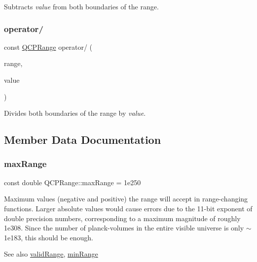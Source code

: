 Subtracts {\itshape value} from both boundaries of the range. \hypertarget{class_q_c_p_range_a4b366a3a21974c88e09b0d39d4a24a4b}{}\label{class_q_c_p_range_a4b366a3a21974c88e09b0d39d4a24a4b} 
\subsubsection{\texorpdfstring{operator/}{operator/}}
{\footnotesize\ttfamily const \hyperlink{class_q_c_p_range}{Q\+C\+P\+Range} operator/ (\begin{DoxyParamCaption}\item[{const \hyperlink{class_q_c_p_range}{Q\+C\+P\+Range} \&}]{range,  }\item[{double}]{value }\end{DoxyParamCaption})\hspace{0.3cm}{\ttfamily [friend]}}

Divides both boundaries of the range by {\itshape value}. 

\subsection{Member Data Documentation}
\hypertarget{class_q_c_p_range_a5ca51e7a2dc5dc0d49527ab171fe1f4f}{}\label{class_q_c_p_range_a5ca51e7a2dc5dc0d49527ab171fe1f4f} 
\subsubsection{\texorpdfstring{max\+Range}{maxRange}}
{\footnotesize\ttfamily const double Q\+C\+P\+Range\+::max\+Range = 1e250\hspace{0.3cm}{\ttfamily [static]}}

Maximum values (negative and positive) the range will accept in range-\/changing functions. Larger absolute values would cause errors due to the 11-\/bit exponent of double precision numbers, corresponding to a maximum magnitude of roughly 1e308. Since the number of planck-\/volumes in the entire visible universe is only $\sim$1e183, this should be enough. \begin{DoxySeeAlso}{See also}
\hyperlink{class_q_c_p_range_ab38bd4841c77c7bb86c9eea0f142dcc0}{valid\+Range}, \hyperlink{class_q_c_p_range_ab46d3bc95030ee25efda41b89e2b616b}{min\+Range} 
\end{DoxySeeAlso}
\hypertarget{class_q_c_p_range_ab46d3bc95030ee25efda41b89e2b616b}{}\label{class_q_c_p_range_ab46d3bc95030ee25efda41b89e2b616b} 

